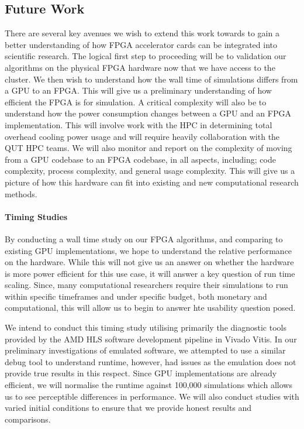 \documentclass[11pt, a4paper]{article}
\begin{document}
	\subsection{Future Work}\label{sec:future_work}
	There are several key avenues we wish to extend this work towards to gain a better understanding of how FPGA accelerator cards can be integrated into scientific research. The logical first step to proceeding will be to validation our algorithms on the physical FPGA hardware now that we have access to the cluster. We then wish to understand how the wall time of simulations differs from a GPU to an FPGA. This will give us a preliminary understanding of how efficient the FPGA is for simulation. A critical complexity will also be to understand how the power consumption changes between a GPU and an FPGA implementation. This will involve work with the HPC in determining total overhead cooling power usage and will require heavily collaboration with the QUT HPC teams. We will also monitor and report on the complexity of moving from a GPU codebase to an FPGA codebase, in all aspects, including; code complexity, process complexity, and general usage complexity. This will give us a picture of how this hardware can fit into existing and new computational research methods. 
	
	\paragraph{Timing Studies}
	By conducting a wall time study on our FPGA algorithms, and comparing to existing GPU implementations, we hope to understand the relative performance on the hardware. While this will not give us an answer on whether the hardware is more power efficient for this use case, it will answer a key question of run time scaling. Since, many computational researchers require their simulations to run within specific timeframes and under specific budget, both monetary and computational, this will allow us to begin to answer hte usability question posed. 
	
	We intend to conduct this timing study utilising primarily the diagnostic tools provided by the AMD HLS software development pipeline in Vivado Vitis. In our preliminary investigations of emulated software, we attempted to use a similar debug tool to understand runtime, however, had issues as the emulation does not provide true results in this respect. Since GPU implementations are already efficient, we will normalise the runtime against 100,000 simulations which allows us to see perceptible differences in performance. We will also conduct studies with varied initial conditions to ensure that we provide honest results and comparisons.
	
\end{document}
